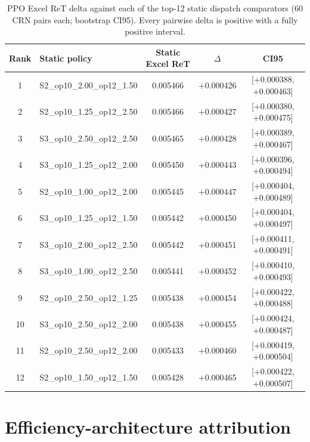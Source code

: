 \documentclass[preprint,12pt]{elsarticle}
\begin{document}
\begin{table}[htbp]
\centering
\caption{PPO Excel ReT delta against each of the top-12 static dispatch
comparators (60 CRN pairs each; bootstrap CI95). Every pairwise delta is
positive with a fully positive interval.}
\label{tab:top12_robustness}
\scriptsize
\setlength{\tabcolsep}{4.0pt}
\begin{tabular}{clccc}
\toprule
Rank & Static policy & Static Excel ReT & $\Delta$ & CI95 \\
\midrule
1 & S2\_op10\_2.00\_op12\_1.50 & 0.005466 & +0.000426 & [+0.000388, +0.000463] \\
2 & S2\_op10\_1.25\_op12\_2.50 & 0.005466 & +0.000427 & [+0.000380, +0.000475] \\
3 & S3\_op10\_2.50\_op12\_2.50 & 0.005465 & +0.000428 & [+0.000389, +0.000467] \\
4 & S3\_op10\_1.25\_op12\_2.00 & 0.005450 & +0.000443 & [+0.000396, +0.000494] \\
5 & S2\_op10\_1.00\_op12\_2.00 & 0.005445 & +0.000447 & [+0.000404, +0.000489] \\
6 & S3\_op10\_1.25\_op12\_1.50 & 0.005442 & +0.000450 & [+0.000404, +0.000497] \\
7 & S3\_op10\_2.00\_op12\_2.50 & 0.005442 & +0.000451 & [+0.000411, +0.000491] \\
8 & S3\_op10\_1.00\_op12\_2.50 & 0.005441 & +0.000452 & [+0.000410, +0.000493] \\
9 & S2\_op10\_2.50\_op12\_1.25 & 0.005438 & +0.000454 & [+0.000422, +0.000488] \\
10 & S3\_op10\_2.50\_op12\_2.00 & 0.005438 & +0.000455 & [+0.000424, +0.000487] \\
11 & S2\_op10\_2.50\_op12\_2.00 & 0.005433 & +0.000460 & [+0.000419, +0.000504] \\
12 & S2\_op10\_1.50\_op12\_1.50 & 0.005428 & +0.000465 & [+0.000422, +0.000507] \\
\bottomrule
\end{tabular}
\end{table}

\section{Efficiency-architecture attribution}\label{appendix-efficiency}
\end{document}
